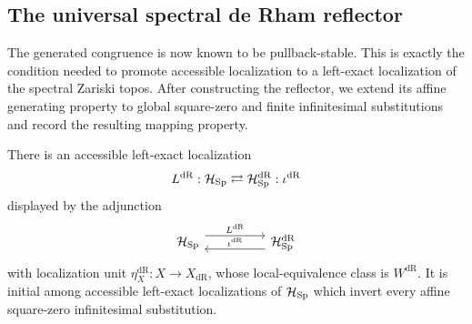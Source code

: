 \subsection{The universal spectral de Rham reflector}
\label{sec:intrinsic-de-Rham-reflector}

The generated congruence is now known to be pullback-stable. This is exactly
the condition needed to promote accessible localization to a left-exact
localization of the spectral Zariski topos. After constructing the reflector,
we extend its affine generating property to global square-zero and finite
infinitesimal substitutions and record the resulting mapping property.

\begin{theorem}
\label{thm:intrinsic-de-Rham-localization}
There is an accessible left-exact localization
\[
  L^{\mathrm{dR}}:
  \mathcal H_{\operatorname{Sp}}
  \rightleftarrows
  \mathcal H_{\operatorname{Sp}}^{\mathrm{dR}}
  :\iota^{\mathrm{dR}}
\]
displayed by the adjunction
\[
\begin{tikzcd}[column sep=huge,row sep=large]
  \mathcal H_{\Sp}
    \arrow[r,shift left=1.2ex,"L^{\mathrm{dR}}"]
  &
  \mathcal H_{\Sp}^{\mathrm{dR}}
    \arrow[l,shift left=1.2ex,"\iota^{\mathrm{dR}}"']
\end{tikzcd}
\]
with localization unit \(\eta_X^{\mathrm{dR}}:X\to X_{\mathrm{dR}}\), whose local-equivalence
class is \(W^{\mathrm{dR}}\). It is initial among accessible left-exact localizations
of \(\mathcal H_{\operatorname{Sp}}\) which invert
every affine square-zero infinitesimal substitution.
\end{theorem}


